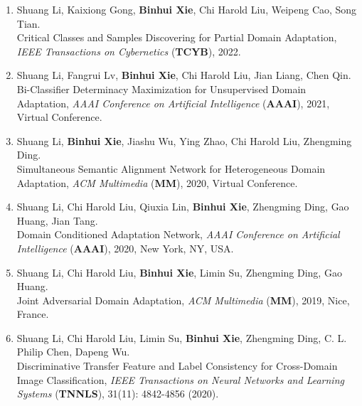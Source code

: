 \documentclass[letterpaper,11pt]{article}
\begin{document}
\begin{enumerate}
    \item Shuang Li, Kaixiong Gong, \textbf{Binhui Xie}, Chi Harold Liu, Weipeng Cao, Song Tian. \\ 
    Critical Classes and Samples Discovering for Partial Domain Adaptation, \textit{IEEE Transactions on Cybernetics} ({\bf TCYB}), 2022.

    \item Shuang Li, Fangrui Lv, \textbf{Binhui Xie}, Chi Harold Liu, Jian Liang, Chen Qin. \\
    Bi-Classifier Determinacy Maximization for Unsupervised Domain Adaptation, \textit{AAAI Conference on Artificial Intelligence} ({\bf AAAI}), 2021, Virtual Conference.

    \item Shuang Li, \textbf{Binhui Xie}, Jiashu Wu, Ying Zhao, Chi Harold Liu, Zhengming Ding. \\
    Simultaneous Semantic Alignment Network for Heterogeneous Domain Adaptation, \textit{ACM Multimedia} ({\bf MM}), 2020, Virtual Conference.

    \item Shuang Li, Chi Harold Liu, Qiuxia Lin, \textbf{Binhui Xie}, Zhengming Ding, Gao Huang, Jian Tang. \\
    Domain Conditioned Adaptation Network, \textit{AAAI Conference on Artificial Intelligence} ({\bf AAAI}), 2020, New York, NY, USA.

    \item Shuang Li, Chi Harold Liu, \textbf{Binhui Xie}, Limin Su, Zhengming Ding, Gao Huang. \\
    Joint Adversarial Domain Adaptation, \textit{ACM Multimedia} ({\bf MM}), 2019, Nice, France.
    
    \item Shuang Li, Chi Harold Liu, Limin Su, \textbf{Binhui Xie}, Zhengming Ding, C. L. Philip Chen, Dapeng Wu. \\ Discriminative Transfer Feature and Label Consistency for Cross-Domain Image Classification, \textit{IEEE Transactions on Neural Networks and Learning Systems} ({\bf TNNLS}), 31(11): 4842-4856 (2020).
\end{enumerate}
\end{document}
